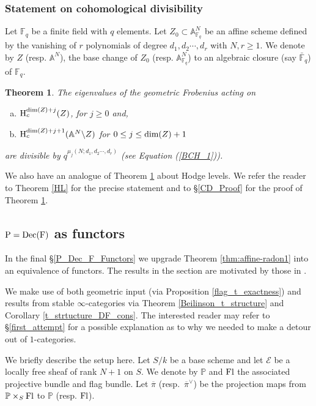 \documentclass[12pt, reqno]{amsart}
\theoremstyle{plain}
\newtheorem{thm}{\bf Theorem}[subsection]
\theoremstyle{definition}
\theoremstyle{definition}
\newcommand{\bbA}{{\mathbb A}}
\newcommand{\bbF}{{\mathbb F}}
\newcommand{\bbP}{{\mathbb P}}
\newcommand{\rH}{{\rm H}}
\newcommand{\sE}{{\mathscr E}}
\begin{document}
\subsubsection{Statement on cohomological divisibility}Let $\bbF_{q}$ be a finite field with $q$ elements. Let $Z_0 \subset \bbA^N_{\bbF_{q}}$ be an affine scheme defined by the vanishing of $r$ polynomials of degree $d_1,d_2 \cdots, d_r$ with $N,r \geq 1$. We denote by $Z$ (resp. $\bbA^N$), the base change of $Z_0$ (resp. $\bbA^N_{\bbF_q}$) to an algebraic closure (say $\bar{\bbF}_q$) of $\bbF_q$. 

\begin{thm}\label{CD_Intro}
    The eigenvalues of the geometric Frobenius acting on 
\begin{enumerate}[(a)]
    \item $\rH_c^{\textup{dim}(Z)+j}(Z)$, for $j\geq 0$ and,
    \item $\rH_c^{\textup{dim}(Z)+j+1}(\bbA^N\backslash Z)$ for $0 \leq j \leq \textup{dim}(Z)+1$
\end{enumerate}
    \noindent are divisible by $q^{\mu_j(N;d_1,d_2 \cdots,d_r)}$ (see Equation (\ref{BCH_1})).
\end{thm}

We also have an analogue of Theorem \ref{CD_Intro} about Hodge levels. We refer the reader to Theorem \ref{HL} for the precise statement and to \S \ref{CD_Proof} for the proof of Theorem \ref{CD_Intro}.

\subsection{$\textup{P}=\textup{Dec(F)}$ as functors}
In the final \S \ref{P_Dec_F_Functors} we upgrade Theorem \ref{thm:affine-radon1} into an equivalence of functors. The results in the section are motivated by those in \cite[\S 5]{BMS19}. 

We make use of both geometric input (via Proposition \ref{flag_t_exactness}) and results from stable $\infty$-categories via Theorem \ref{Beilinson_t_structure} and Corollary \ref{t_strtucture_DF_cons}. The interested reader may refer to \S \ref{first_attempt} for a possible explanation as to why we needed to make a detour out of $1$-categories. 

We briefly describe the setup here. Let $S/k$ be a base scheme and let $\sE$ be a locally free sheaf of rank $N+1$ on $S$. We denote by $\bbP$ and $\textup{Fl}$ the associated projective bundle and flag bundle. Let $\overline{\pi}$ (resp.~$\overline{\pi}^{\vee}$) be the projection maps from $\bbP \times_S \textup{Fl}$ to $\bbP$ (resp. $\textup{Fl}$).
\end{document}
